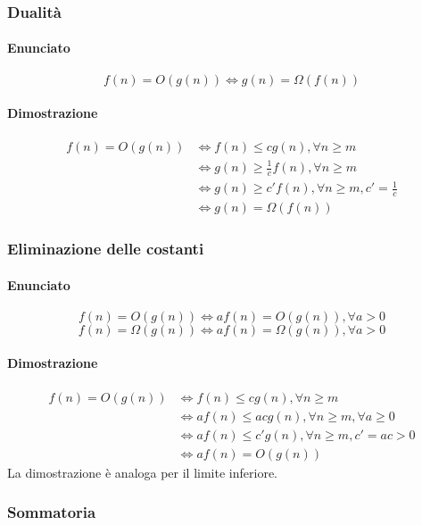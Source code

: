 \subsubsection{Dualit\`a}
\paragraph{Enunciato}
\begin{equation*}
f(n)=O(g(n))\Leftrightarrow g(n)=\Omega(f(n))
\end{equation*}
\paragraph{Dimostrazione}
\begin{align*}
f(n)=O(g(n))&\Leftrightarrow f(n)\le cg(n),\forall n\ge m\\
&\Leftrightarrow g(n)\ge \frac{1}{c}f(n), \forall n\ge m\\
&\Leftrightarrow g(n)\ge c'f(n),\forall n\ge m, c'=\frac{1}{c}\\
&\Leftrightarrow g(n)=\Omega(f(n))
\end{align*}
\subsubsection{Eliminazione delle costanti}
\paragraph{Enunciato}
\begin{equation*}
f(n)=O(g(n))\Leftrightarrow af(n)=O(g(n)),\forall a>0
\end{equation*}
\begin{equation*}
f(n)=\Omega(g(n))\Leftrightarrow af(n)=\Omega(g(n)),\forall a>0
\end{equation*}
\paragraph{Dimostrazione}
\begin{align*}
f(n)=O(g(n))&\Leftrightarrow f(n)\le cg(n),\forall n\ge m\\
&\Leftrightarrow af(n)\le acg(n),\forall n\ge m,\forall a\ge 0\\
&\Leftrightarrow af(n)\le c'g(n),\forall n\ge m,c'=ac>0\\
&\Leftrightarrow af(n)=O(g(n))
\end{align*}
La dimostrazione \`e analoga per il limite inferiore.
\subsubsection{Sommatoria}
